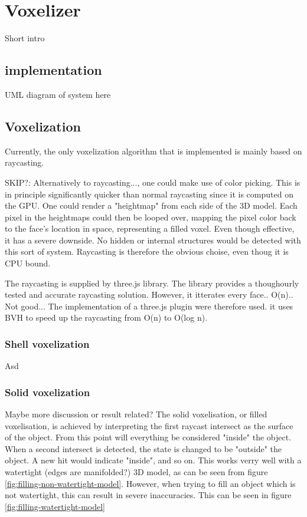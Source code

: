 \section{Voxelizer}
Short intro
\subsection{implementation}
\colorbox{RubineRed}{UML diagram of system here}

\subsection{Voxelization}
Currently, the only voxelization algorithm that is implemented is mainly based on raycasting.

\colorbox{RubineRed}{SKIP?:
Alternatively to raycasting}..., one could make use of color picking. This is in principle significantly quicker than normal raycasting since it is computed on the GPU. One could render a "heightmap" from each side of the 3D model. Each pixel in the heightmaps could then be looped over, mapping the pixel color back to the face's location in space, representing a filled voxel. Even though effective, it has a severe downside. No hidden or internal structures would be detected with this sort of system. Raycasting is therefore the obvious choise, even thoug it is CPU bound.


The raycasting is supplied by three.js library. The library provides a thoughourly tested and accurate raycasting solution. However, it itterates every face.. O(n).. Not good... The implementation of a three.js plugin were therefore used. it uses BVH to speed up the raycasting from O(n) to O(log n).

\subsubsection{Shell voxelization}
Asd

\subsubsection{Solid voxelization}
\colorbox{RubineRed}{Maybe more discussion or result related?}
The solid voxelisation, or filled voxelisation, is achieved by interpreting the first raycast intersect as the surface of the object. From this point will everything be considered "inside" the object. When a second intersect is detected, the state is changed to be "outside" the object. A new hit would indicate "inside", and so on. This works verry well with a watertight (\colorbox{RubineRed}{edges are manifolded?}) 3D model, as can be seen from figure \ref{fig:filling-non-watertight-model}. However, when trying to fill an object which is not watertight, this can result in severe inaccuracies. This can be seen in figure \ref{fig:filling-watertight-model}

